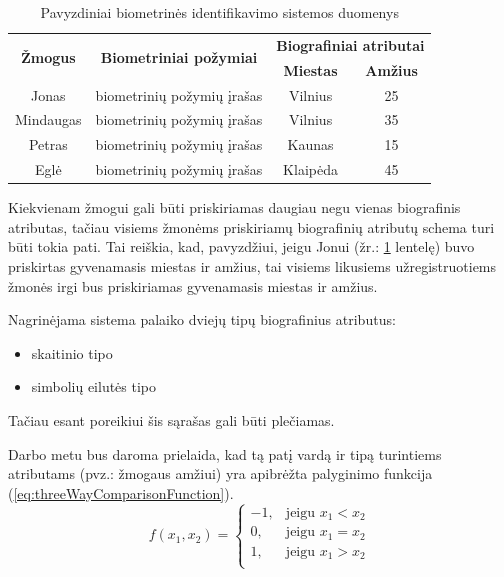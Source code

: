 \begin{table}[H]\footnotesize
	\centering
	\begin{tabular}{|c|c|c|c|}
		\hline
		\multirow{2}{*}{{\bf Žmogus}} & \multirow{2}{*}{{\bf Biometriniai požymiai}} & \multicolumn{2}{|c|}{{\bf Biografiniai atributai}}  \\ \cline{3-4}
		& & {\bf Miestas} & {\bf Amžius} \\
		\hline
		Jonas  & biometrinių požymių įrašas & Vilnius & 25 \\ \cline{2-4}
		\hline
		Mindaugas & biometrinių požymių įrašas & Vilnius & 35 \\ \cline{2-4}
		\hline
		Petras & biometrinių požymių įrašas & Kaunas & 15 \\ \cline{2-4}
		\hline
		Eglė & biometrinių požymių įrašas & Klaipėda & 45 \\ \cline{2-4}
		\hline
	\end{tabular}
	\caption{Pavyzdiniai biometrinės identifikavimo sistemos duomenys}
	\label{tab:exampleGallery}
\end{table}

Kiekvienam žmogui gali būti priskiriamas daugiau negu vienas biografinis atributas, tačiau visiems žmonėms priskiriamų biografinių atributų schema turi būti tokia pati.
Tai reiškia, kad, pavyzdžiui, jeigu Jonui (žr.: \ref{tab:exampleGallery} lentelę) buvo priskirtas gyvenamasis miestas ir amžius, tai visiems likusiems užregistruotiems žmonės irgi bus priskiriamas gyvenamasis miestas ir amžius.

Nagrinėjama sistema palaiko dviejų tipų biografinius atributus:
\begin{itemize}
\item skaitinio tipo
\item simbolių eilutės tipo
\end{itemize}
Tačiau esant poreikiui šis sąrašas gali būti plečiamas.

Darbo metu bus daroma prielaida, kad tą patį vardą ir tipą turintiems atributams (pvz.: žmogaus amžiui) yra apibrėžta palyginimo funkcija (\ref{eq:threeWayComparisonFunction}).
\begin{equation}
	f(x_1, x_2)=
\begin{cases}
	-1,& \text{jeigu } x_1 < x_2\\
	0,& \text{jeigu } x_1 = x_2\\
	1,& \text{jeigu } x_1 > x_2\\
\end{cases}
\label{eq:threeWayComparisonFunction}
\end{equation}

